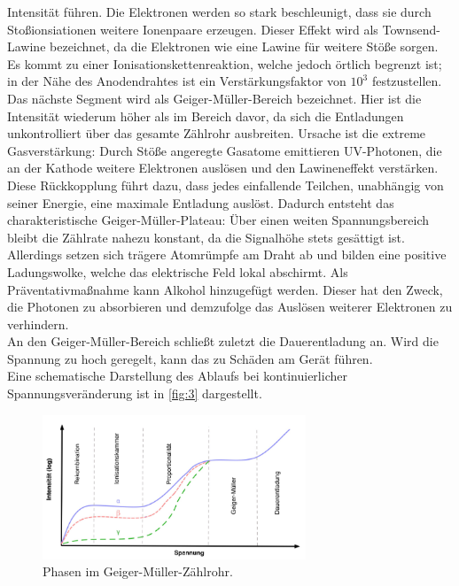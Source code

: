 Intensität führen. Die Elektronen werden so stark beschleunigt, dass sie durch 
Stoßionsiationen weitere Ionenpaare erzeugen. Dieser Effekt wird als Townsend-
Lawine bezeichnet, da die Elektronen wie eine Lawine für weitere Stöße sorgen.
Es kommt zu einer Ionisationskettenreaktion, welche jedoch örtlich begrenzt ist;
in der Nähe des Anodendrahtes ist ein Verstärkungsfaktor von $10^3$ festzustellen.
\vspace{0.5em}
\\
\noindent Das nächste Segment wird als Geiger-Müller-Bereich bezeichnet. Hier
ist die Intensität wiederum höher als im Bereich davor, da sich die Entladungen
unkontrolliert über das gesamte Zählrohr ausbreiten. Ursache ist die extreme
Gasverstärkung: Durch Stöße angeregte Gasatome emittieren UV-Photonen, die an
der Kathode weitere Elektronen auslösen und den Lawineneffekt verstärken.
Diese Rückkopplung führt dazu, dass jedes einfallende Teilchen, unabhängig
von seiner Energie, eine maximale Entladung auslöst. Dadurch entsteht das
charakteristische Geiger-Müller-Plateau: Über einen weiten Spannungsbereich 
bleibt die Zählrate nahezu konstant, da die Signalhöhe stets gesättigt ist.
Allerdings setzen sich trägere Atomrümpfe am Draht ab und bilden
eine positive Ladungswolke, welche das elektrische Feld lokal abschirmt. Als
Präventativmaßnahme kann Alkohol hinzugefügt werden. Dieser hat den Zweck, die
Photonen zu absorbieren und demzufolge das Auslösen weiterer Elektronen zu
verhindern.
\vspace{0.5em}
\\
\noindent An den Geiger-Müller-Bereich schließt zuletzt die Dauerentladung an.
Wird die Spannung zu hoch geregelt, kann das zu Schäden am Gerät führen.
\vspace{0.5em}
\\
\noindent Eine schematische Darstellung des Ablaufs bei kontinuierlicher 
Spannungsveränderung ist in \autoref{fig:3} dargestellt.
\begin{figure}[H]
    \centering
        \centering
        \includegraphics[width=0.7\textwidth]{Bilder/phasen.png}
        \caption{Phasen im Geiger-Müller-Zählrohr. \cite{anleitung6}}
    \hfill
    \label{fig:3}
\end{figure}

